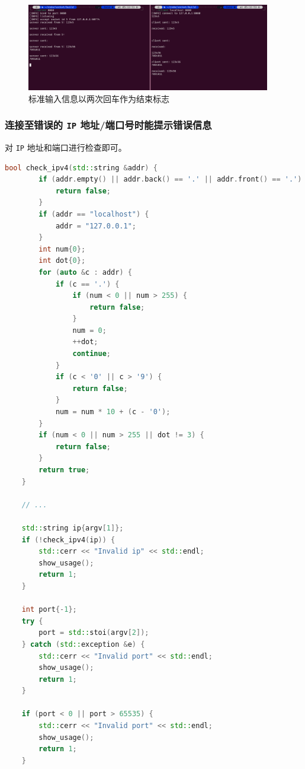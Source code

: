 \documentclass{article}
\begin{document}
\begin{figure}[H]
    \centering
    \includegraphics[width=0.95\textwidth]{img/5.png}
    \caption{标准输入信息以两次回车作为结束标志}
\end{figure}

\subsubsection{连接至错误的 \texttt{IP} 地址/端口号时能提示错误信息}

对 \texttt{IP} 地址和端口进行检查即可。

\begin{lstlisting}[language=C++]
    bool check_ipv4(std::string &addr) {
        if (addr.empty() || addr.back() == '.' || addr.front() == '.') {
            return false;
        }
        if (addr == "localhost") {
            addr = "127.0.0.1";
        }
        int num{0};
        int dot{0};
        for (auto &c : addr) {
            if (c == '.') {
                if (num < 0 || num > 255) {
                    return false;
                }
                num = 0;
                ++dot;
                continue;
            }
            if (c < '0' || c > '9') {
                return false;
            }
            num = num * 10 + (c - '0');
        }
        if (num < 0 || num > 255 || dot != 3) {
            return false;
        }
        return true;
    }
    
    // ...

    std::string ip{argv[1]};
    if (!check_ipv4(ip)) {
        std::cerr << "Invalid ip" << std::endl;
        show_usage();
        return 1;
    }

    int port{-1};
    try {
        port = std::stoi(argv[2]);
    } catch (std::exception &e) {
        std::cerr << "Invalid port" << std::endl;
        show_usage();
        return 1;
    }

    if (port < 0 || port > 65535) {
        std::cerr << "Invalid port" << std::endl;
        show_usage();
        return 1;
    }
\end{lstlisting}
\end{document}
